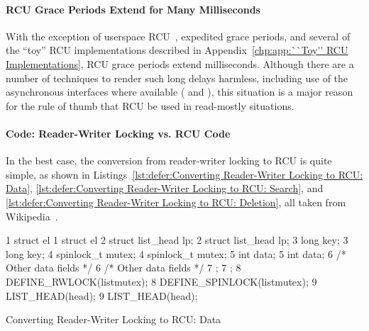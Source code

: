 \paragraph{RCU Grace Periods Extend for Many Milliseconds}

With the exception of userspace
RCU~\cite{MathieuDesnoyers2009URCU,PaulMcKenney2013LWNURCU},
expedited grace periods, and several of the ``toy''
RCU implementations described in
Appendix~\ref{chp:app:``Toy'' RCU Implementations},
RCU grace periods extend milliseconds.
Although there are a number of techniques to render such long delays
harmless, including use of the asynchronous interfaces where available
( and ), this situation
is a major reason for the rule of thumb that RCU be used in read-mostly
situations.

\paragraph{Code: Reader-Writer Locking vs. RCU Code}

In the best case, the conversion from reader-writer locking to RCU
is quite simple, as shown in
Listings~\ref{lst:defer:Converting Reader-Writer Locking to RCU: Data},
\ref{lst:defer:Converting Reader-Writer Locking to RCU: Search},
and
\ref{lst:defer:Converting Reader-Writer Locking to RCU: Deletion},
all taken from
Wikipedia~\cite{WikipediaRCU}.

\begin{listing*}[htbp]
{ \scriptsize
\begin{verbbox}
 1 struct el {                           1 struct el {
 2   struct list_head lp;                2   struct list_head lp;
 3   long key;                           3   long key;
 4   spinlock_t mutex;                   4   spinlock_t mutex;
 5   int data;                           5   int data;
 6   /* Other data fields */             6   /* Other data fields */
 7 };                                    7 };
 8 DEFINE_RWLOCK(listmutex);             8 DEFINE_SPINLOCK(listmutex);
 9 LIST_HEAD(head);                      9 LIST_HEAD(head);
\end{verbbox}
}
\hspace*{0.9in}\OneColumnHSpace{-0.5in}
\theverbbox
\caption{Converting Reader-Writer Locking to RCU: Data}
\label{lst:defer:Converting Reader-Writer Locking to RCU: Data}
\end{listing*}

